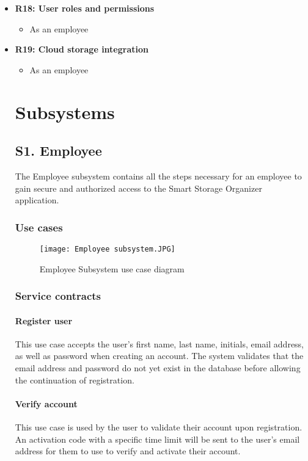 \documentclass[hidelinks, 12pt, a4paper]{article}
\begin{document}
\begin{itemize}
    \item \textbf{R18: User roles and permissions}
    \begin{itemize}
        \item As an employee
    \end{itemize}

    \item \textbf{R19: Cloud storage integration}
    \begin{itemize}
        \item As an employee
    \end{itemize}
    \pagebreak



    \section{Subsystems}
    \subsection{S1. Employee}
    The Employee subsystem contains all the steps necessary for an employee to gain secure and authorized access to the Smart Storage Organizer application.
    \subsubsection{Use cases}
    \begin{figure}[H]
        \centering
        \texttt{[image: Employee subsystem.JPG]}
        \caption{Employee Subsystem use case diagram}
        \label{fig:EmployeeSubsystemDiagram}
    \end{figure}
    \subsubsection{Service contracts}
    \paragraph{Register user}
    This use case accepts the user's first name, last name, initials, email address, as well as password when creating an account. The system validates that the email address and password do not yet exist in the database before allowing the continuation of registration.
    \paragraph{Verify account}
    This use case is used by the user to validate their account upon registration. An activation code with a specific time limit will be sent to the user's email address for them to use to verify and activate their account.

\end{itemize}
\end{document}
